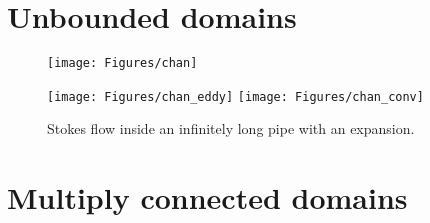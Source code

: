 \section{Unbounded domains \label{sec:unbounded}}


\begin{figure}[H]
	\centering
	\texttt{[image: Figures/chan]}
	
	\vspace{2em}
	\texttt{[image: Figures/chan\_eddy]}
	\hfill
	\texttt{[image: Figures/chan\_conv]}
	
	\label{fig:chan}
	\caption{Stokes flow inside an infinitely long pipe with an expansion.}
\end{figure} 

\section{Multiply connected domains \label{sec:multiply}}


